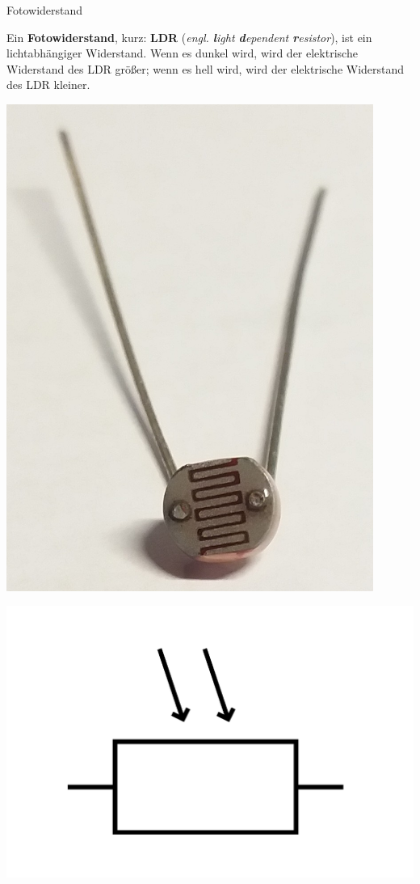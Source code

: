 \begin{zsfg}{Fotowiderstand}
	\begin{minipage}{0.7\textwidth}
		Ein \textbf{Fotowiderstand}, kurz: \textbf{LDR} (\emph{engl. \textbf{l}ight \textbf{d}ependent \textbf{r}esistor}), ist ein lichtabhängiger Widerstand. Wenn es dunkel wird, wird der elektrische Widerstand des LDR größer; wenn es hell wird, wird der elektrische Widerstand des LDR kleiner.
	\end{minipage}
	\hfill
	\begin{minipage}{0.28\textwidth}
		\begin{minipage}{0.48\textwidth}
			\centering
			\includegraphics[width=0.9\textwidth]{./pics/ldr.jpg}
		\end{minipage}
		\hfill
		\begin{minipage}{0.48\textwidth}
			\centering
			\includegraphics[width=\textwidth]{./pics/ldr-schaltsymbol.png}

\end{minipage}
\end{minipage}
\end{zsfg}
